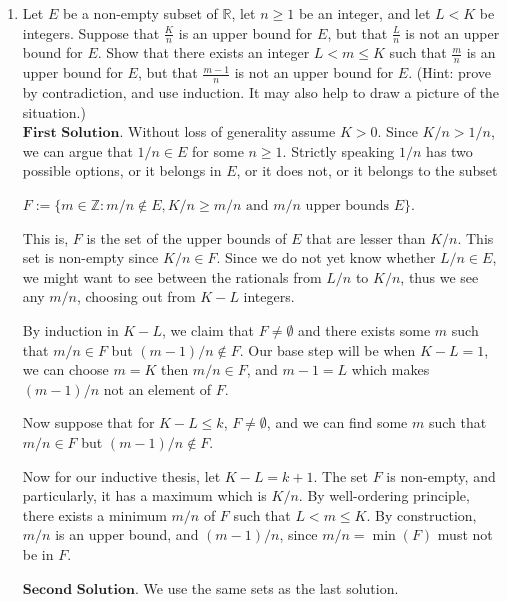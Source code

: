 \documentclass{article}
\theoremstyle{remark}
\begin{document}
\begin{enumerate}
            \item Let \( E \) be a non-empty subset of \( \mathbb{R} \), let \( n \geq 1 \) be an integer, and let \( L < K \) be integers. 
            Suppose that \( \frac{K}{n} \) is an upper bound for \( E \), but that \( \frac{L}{n} \) is not an upper bound for \( E \). Show that there exists an integer \( L < m \leq K \) such that \( \frac{m}{n} \) is an upper bound for \( E \), 
            but that \( \frac{m - 1}{n} \) is not an upper bound for \( E \). (Hint: prove by contradiction, and use induction. It may also help to draw a picture of the situation.)\\
            $\textbf{First Solution.}$
            Without loss of generality assume $K > 0$.
            Since $K/n > 1/n$, we can argue that $1/n \in E$ for some $n\geq 1$.
            Strictly speaking $1/n$ has two possible options, or it belongs in $E$, or it does not, or it belongs to the subset
            \begin{center}
                $F := \{m \in \mathbb{Z}: m/n \notin E, K/n \geq m/n \text{ and } m/n \text{ upper bounds } E\}$.
            \end{center}
            This is, $F$ is the set of the upper bounds of $E$ that are lesser than $K/n$.
            This set is non-empty since $K/n \in F$. Since we do not yet know whether $L/n \in E$,
            we might want to see between the rationals from $L/n$ to $K/n$, thus we see any $m/n$, choosing out from $K-L$ integers.
            
            By induction in $K-L$, we claim that $F \neq \emptyset$ and there exists some $m$ such that $m/n \in F$ but $(m-1)/n \notin F$.
            Our base step will be when $K - L = 1$, we can choose $m = K$ then $m/n \in F$, and $m-1 = L$ which 
            makes $(m-1)/n$ not an element of $F$.
            
            Now suppose that for $K-L \leq k$, $F \neq \emptyset$, and we can find some $m$ such that $m/n \in F$ but $(m-1)/n \notin F$.
            
            Now for our inductive thesis, let $K-L = k+1$. The set $F$ is non-empty, and particularly, it has a maximum which is $K/n$.
            By well-ordering principle, there exists a minimum $m/n$ of $F$ such that $L< m \leq K$.
            By construction, $m/n$ is an upper bound, and $(m-1)/n$, since $m/n = \min(F)$ must not be in $F$.

            $\textbf{Second Solution.}$
            We use the same sets as the last solution.


\end{enumerate}
\end{document}
